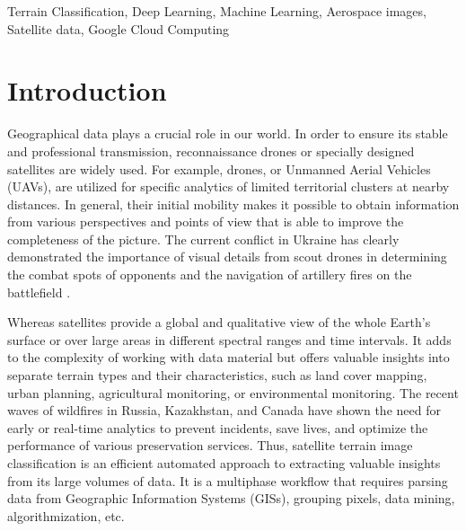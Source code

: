 \documentclass[conference]{IEEEtran}
\begin{document}
\begin{abstract}
This paper introduces a simple implementation of three versions (large, medium, and small) of terrain multi-classification models using Fully Convolutional Neural Networks (FCNNs) for imagery data. The proposed methodology involves labeled and unlabeled data collection from European Space Agency (ESA) WorldCover and Sentinel-2 MultiSpectral Instrument (MSI) on the Google Earth Engine, compressing datasets into Tensorflow records format with 9 diverse terrain types, and handling Google Cloud training computations. There were prepared different dataset portions of 10 megabytes, 200 megabytes, and around a gigabyte files. The experimental results demonstrate the effectiveness of the CNN-based approach, achieving a tolerable 71\% accuracy of the Terrain Classification Model (TCM) and robust classification performance. The simplicity and efficiency of the proposed method make it suitable for real-world applications requiring reliable and fast terrain classification.
\end{abstract}

\begin{IEEEkeywords}
Terrain Classification, Deep Learning, Machine Learning, Aerospace images, Satellite data, Google Cloud Computing
\end{IEEEkeywords}


\section{Introduction}
Geographical data plays a crucial role in our world. In order to ensure its stable and professional transmission, reconnaissance drones or specially designed satellites are widely used. For example, drones, or Unmanned Aerial Vehicles (UAVs), are utilized for specific analytics of limited territorial clusters at nearby distances. In general, their initial mobility makes it possible to obtain information from various perspectives and points of view that is able to improve the completeness of the picture. The current conflict in Ukraine has clearly demonstrated the importance of visual details from scout drones in determining the combat spots of opponents and the navigation of artillery fires on the battlefield \cite{b1}.

Whereas satellites provide a global and qualitative view of the whole Earth’s surface or over large areas in different spectral ranges and time intervals. It adds to the complexity of working with data material but offers valuable insights into separate terrain types and their characteristics, such as land cover mapping, urban planning, agricultural monitoring, or environmental monitoring. The recent waves of wildfires in Russia, Kazakhstan, and Canada have shown the need for early or real-time analytics to prevent incidents, save lives, and optimize the performance of various preservation services. Thus, satellite terrain image classification is an efficient automated approach to extracting valuable insights from its large volumes of data. It is a multiphase workflow that requires parsing data from Geographic Information Systems (GISs), grouping pixels, data mining, algorithmization, etc.
\end{document}
